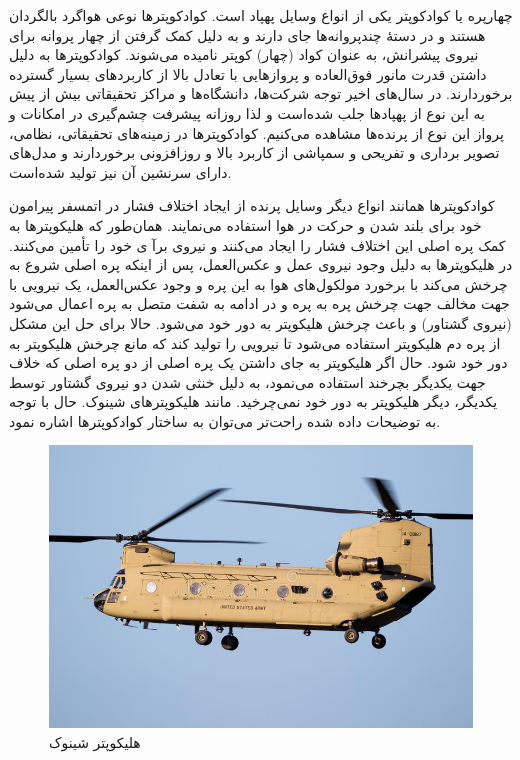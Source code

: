 


چهارپره یا کوادکوپتر یکی از انواع وسایل پهپاد است. کوادکوپترها نوعی هواگرد بالگردان هستند و در دستهٔ چندپروانه‌ها جای دارند و به دلیل کمک گرفتن از چهار پروانه برای نیروی پیشرانش، به عنوان کواد (چهار) کوپتر نامیده می‌شوند. کوادکوپترها به دلیل داشتن قدرت مانور فوق‌العاده و پروازهایی با تعادل بالا از کاربردهای بسیار گسترده برخوردارند.
در سال‌های اخیر توجه شرکت‌ها، دانشگاه‌ها و مراکز تحقیقاتی بیش از پیش به این نوع از پهپادها جلب شده‌است و لذا روزانه پیشرفت چشم‌گیری در امکانات و پرواز این نوع از پرنده‌ها مشاهده می‌کنیم. کوادکوپترها در زمینه‌های تحقیقاتی، نظامی، تصویر برداری و تفریحی و سمپاشی از کاربرد بالا و روزافزونی برخوردارند و مدل‌های دارای سرنشین آن نیز تولید شده‌است.




کوادکوپترها همانند انواع دیگر وسایل پرنده از ایجاد اختلاف فشار در اتمسفر پیرامون خود برای بلند شدن و حرکت در هوا استفاده می‌نمایند. همان‌طور که هلیکوپتر‌ها به کمک پره اصلی این اختلاف فشار را ایجاد می‌کنند و نیروی برآ ی خود را تأمین می‌کنند. در هلیکوپترها به دلیل وجود نیروی عمل و عکس‌العمل، پس از اینکه پره اصلی شروع به چرخش می‌کند با برخورد مولکول‌های هوا به این پره و وجود عکس‌العمل، یک نیرویی با جهت مخالف جهت چرخش پره به پره و در ادامه به شفت متصل به پره اعمال می‌شود (نیروی گشتاور) و باعث چرخش هلیکوپتر به دور خود می‌شود. حالا برای حل این مشکل از پره دم هلیکوپتر استفاده می‌شود تا نیرویی را تولید کند که مانع چرخش هلیکوپتر به دور خود شود. حال اگر هلیکوپتر به جای داشتن یک پره اصلی از دو پره اصلی که خلاف جهت یکدیگر بچرخند استفاده می‌نمود، به دلیل خنثی شدن دو نیروی گشتاور توسط یکدیگر، دیگر هلیکوپتر به دور خود نمی‌چرخید. مانند هلیکوپترهای شینوک. حال با توجه به توضیحات داده شده راحت‌تر می‌توان به ساختار کوادکوپترها اشاره نمود.
\begin{figure}[H]
	\includegraphics[width=12cm]{figs/introduction/boeing-ch-chinook.jpg}
	\centering
	\caption{هلیکوپتر شینوک}
\end{figure}


